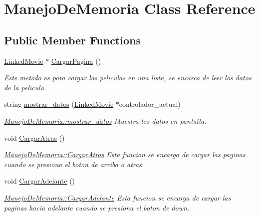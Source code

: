 \hypertarget{classManejoDeMemoria}{}\section{Manejo\+De\+Memoria Class Reference}
\label{classManejoDeMemoria}
\subsection*{Public Member Functions}
\begin{DoxyCompactItemize}
\item 
\hyperlink{classLinkedMovie}{Linked\+Movie} $\ast$ \hyperlink{classManejoDeMemoria_ab49d59242fb72d41a4885ef410ce77ff}{Cargar\+Pagina} ()
\begin{DoxyCompactList}\small\item\em Este metodo es para cargar las peliculas en una lista, se encarca de leer los datos de la pelicula. \end{DoxyCompactList}\item 
string \hyperlink{classManejoDeMemoria_a38d5e04bb74cb2f51ba1cb13d98a368a}{mostrar\+\_\+datos} (\hyperlink{classLinkedMovie}{Linked\+Movie} $\ast$controlador\+\_\+actual)
\begin{DoxyCompactList}\small\item\em \hyperlink{classManejoDeMemoria_a38d5e04bb74cb2f51ba1cb13d98a368a}{Manejo\+De\+Memoria\+::mostrar\+\_\+datos} Muestra los datos en pantalla. \end{DoxyCompactList}\item 
\mbox{\label{classManejoDeMemoria_aa1462f44529cfb49fe460f8230c2c61b}} 
void \hyperlink{classManejoDeMemoria_aa1462f44529cfb49fe460f8230c2c61b}{Cargar\+Atras} ()
\begin{DoxyCompactList}\small\item\em \hyperlink{classManejoDeMemoria_aa1462f44529cfb49fe460f8230c2c61b}{Manejo\+De\+Memoria\+::\+Cargar\+Atras} Esta funcion se encarga de cargar las paginas cuando se presiona el boton de arriba o atras. \end{DoxyCompactList}\item 
\mbox{\label{classManejoDeMemoria_aadddc5787612d91d740fbd7c245cebd2}} 
void \hyperlink{classManejoDeMemoria_aadddc5787612d91d740fbd7c245cebd2}{Cargar\+Adelante} ()
\begin{DoxyCompactList}\small\item\em \hyperlink{classManejoDeMemoria_aadddc5787612d91d740fbd7c245cebd2}{Manejo\+De\+Memoria\+::\+Cargar\+Adelante} Esta funcion se encarga de cargar las paginas hacia adelante cuando se presiona el boton de down. \end{DoxyCompactList}\item 

\end{DoxyCompactItemize}

